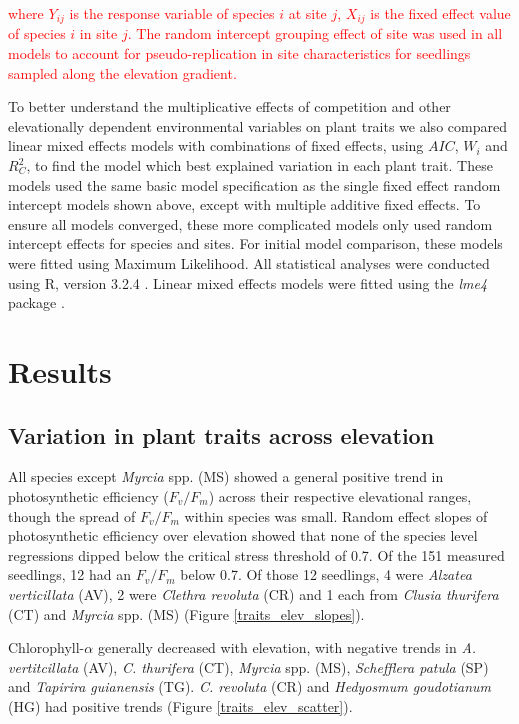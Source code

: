 \documentclass[a4paper, 11pt]{article}
\newcommand{\todo}[1]{\textcolor{red}{#1}}   %
\begin{document}
\todo{where $Y_{ij}$ is the response variable of species $i$ at site $j$, $X_{ij}$ is the fixed effect value of species $i$ in site $j$. The random intercept grouping effect of site was used in all models to account for pseudo-replication in site characteristics for seedlings sampled along the elevation gradient.}

To better understand the multiplicative effects of competition and other elevationally dependent environmental variables on plant traits we also compared linear mixed effects models with combinations of fixed effects, using $AIC$, $W_i$ and $R_C^2$, to find the model which best explained variation in each plant trait. These models used the same basic model specification as the single fixed effect random intercept models shown above, except with multiple additive fixed effects. To ensure all models converged, these more complicated models only used random intercept effects for species and sites. For initial model comparison, these models were fitted using Maximum Likelihood. All statistical analyses were conducted using R, version 3.2.4 \citep{R2019}. Linear mixed effects models were fitted using the \textit{lme4} package \citep{Bates2015}.

\section{Results}

\subsection{Variation in plant traits across elevation}

All species except \textit{Myrcia} spp. (MS) showed a general positive trend in photosynthetic efficiency ($F_v/F_m$) across their respective elevational ranges, though the spread of $F_v/F_m$ within species was small. Random effect slopes of photosynthetic efficiency over elevation showed that none of the species level regressions dipped below the critical stress threshold of 0.7. Of the 151 measured seedlings, 12 had an $F_v/F_m$ below 0.7. Of those 12 seedlings, 4 were \textit{Alzatea verticillata} (AV), 2 were  \textit{Clethra revoluta} (CR) and 1 each from \textit{Clusia thurifera} (CT) and \textit{Myrcia} spp. (MS) (Figure \ref{traits_elev_slopes}). 

Chlorophyll-$\alpha$ generally decreased with elevation, with negative trends in \textit{A. vertitcillata} (AV), \textit{C. thurifera} (CT), \textit{Myrcia} spp. (MS), \textit{Schefflera patula} (SP) and \textit{Tapirira guianensis} (TG). \textit{C. revoluta} (CR)  and \textit{Hedyosmum goudotianum} (HG) had positive trends (Figure \ref{traits_elev_scatter}). 
\end{document}
